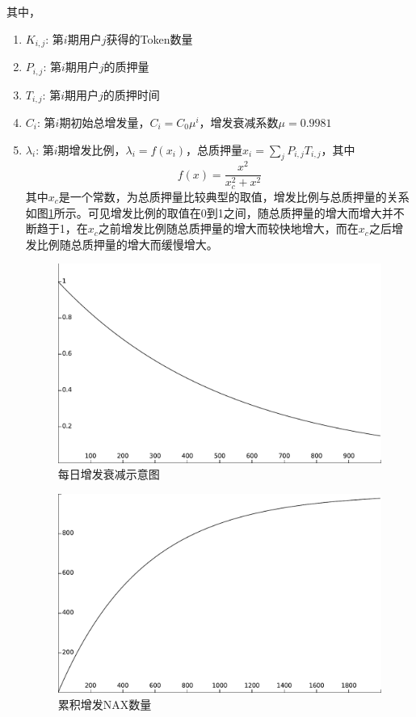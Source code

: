 其中，
\begin{enumerate}
   \item \(K_{i,j}\): 第\(i\)期用户\(j\)获得的Token数量
   \item \(P_{i,j}\): 第\(i\)期用户\(j\)的质押量
   \item \(T_{i,j}\): 第\(i\)期用户\(j\)的质押时间
   \item \(C_i\): 第\(i\)期初始总增发量，\(C_i=C_0 \mu^i\)，增发衰减系数$\mu=0.9981$
   \item \(\lambda_i\): 第\(i\)期增发比例，\(\lambda_i = f(x_i)\)，总质押量\(x_i = \sum_j P_{i,j} T_{i,j}\)，其中
     \begin{equation}
       f(x) = \frac{x^2}{x_c^2+x^2}
     \end{equation}
     其中\(x_c\)是一个常数，为总质押量比较典型的取值，增发比例与总质押量的关系如图\ref{func}所示。可见增发比例的取值在0到1之间，随总质押量的增大而增大并不断趋于1，在\(x_c\)之前增发比例随总质押量的增大而较快地增大，而在\(x_c\)之后增发比例随总质押量的增大而缓慢增大。
    \begin{figure}
      \centering
      \includegraphics[scale=0.4]{../common/ch/everyday.pdf}
      \caption{每日增发衰减示意图}\label{func}
    \end{figure}
    \begin{figure}
      \centering
      \includegraphics[scale=0.4]{../common/ch/acc.pdf}
      \caption{累积增发NAX数量}\label{acc}
    \end{figure}
\end{enumerate}
